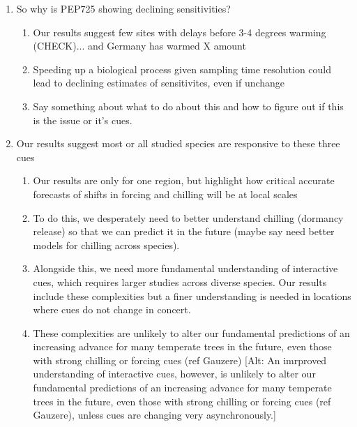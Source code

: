 \documentclass[11pt,letter]{article}
\begin{document}
{\begin{enumerate}
\begin{enumerate}
\item Chilling often increases with small amounts of warming in some sites
\item Even if warming only happens in the winter, it takes a lot of warming to see a delay due to decreased chilling
\item At higher warming do see a leveling off or delay due to decreased chilling at some sites
\item Depends a lot on local climate... We also find that patterns of advancment with warming vary considerably depending on the current/background climate (e.g. how much advancement will continue with warming depends on how much chilling is currently experienced and whether that will increase or decrease with warming.)
\item (Compare advances in our models to PEP725 data?)
\item Photoperiod effects are minimal, even for \emph{Fagus}
\end{enumerate}
\item So why is PEP725 showing declining sensitivities?
\begin{enumerate}
\item Our results suggest few sites with delays before 3-4 degrees warming (CHECK)... and Germany has warmed X amount
\item Speeding up a biological process given sampling time resolution could lead to declining estimates of sensitivites, even if unchange
\item Say something about what to do about this and how to figure out if this is the issue or it's cues. 
\end{enumerate}
\item Our results suggest most or all studied species are responsive to these three cues
\begin{enumerate}
\item Our results are only for one region, but highlight how critical accurate forecasts of shifts in forcing and chilling will be at local scales
\item To do this, we desperately need to better understand chilling (dormancy release) so that we can predict it in the future (maybe say need better models for chilling across species). 
\item Alongside this, we need more fundamental understanding of interactive cues, which requires larger studies across diverse species. Our results include these complexities but a finer understanding is needed in locations where cues do not change in concert.
\item These complexities are unlikely to alter our fundamental predictions of an increasing advance for many temperate trees in the future, even those with strong chilling or forcing cues (ref Gauzere) [Alt: An imrproved understanding of interactive cues, however, is unlikely to alter our fundamental predictions of an increasing advance for many temperate trees in the future, even those with strong chilling or forcing cues (ref Gauzere), unless cues are changing very asynchronously.]
\end{enumerate}
\end{enumerate}

}
\end{document}
